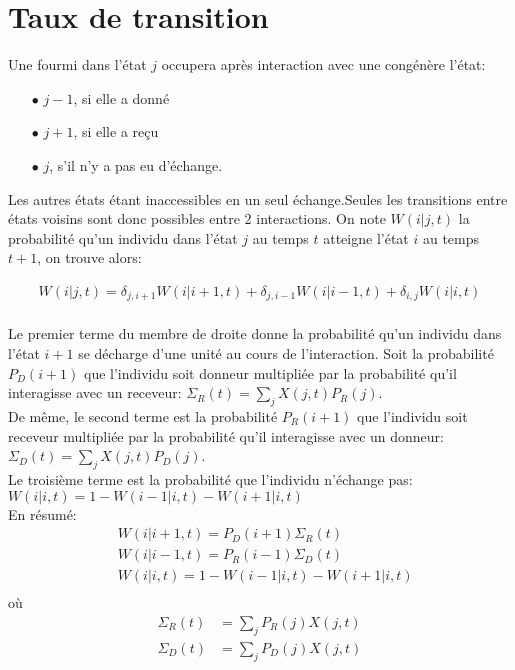 \section{Taux de transition}
Une fourmi dans l'état $j$ occupera après interaction avec une congénère l'état:
\begin{itemize}
\item[$\bullet$] $j-1$, si elle a donné
\item[$\bullet$] $j+1$, si elle a reçu
\item[$\bullet$] $j$, s'il n'y a pas eu d'échange.
\end{itemize}
Les autres états étant inaccessibles en un seul échange.Seules les transitions entre états voisins sont donc possibles entre 2 interactions. On note $W(i|j,t)$ la probabilité qu'un individu dans l'état $j$ au temps $t$ atteigne l'état $i$ au temps $t+1$, on trouve alors:


\begin{equation}
\begin{aligned}
W(i|j,t) = \delta_{j,i+1} W(i|i+1,t) + \delta_{j,i-1} W(i|i-1,t) + \delta_{i,j} W(i|i,t)\\
\label{Wij}
\end{aligned}
\end{equation}


Le premier terme du membre de droite donne la probabilité qu'un individu dans l'état $i+1$ se décharge d'une unité au cours de l'interaction. Soit la probabilité $P_D(i+1)$ que l'individu soit donneur multipliée par la probabilité qu'il interagisse avec un receveur: $\Sigma_R(t) = \sum_j X(j,t) P_R(j)$.\\
De même, le second terme est la probabilité $P_R(i+1)$ que l'individu soit receveur multipliée par la probabilité qu'il interagisse avec un donneur: $\Sigma_D(t) = \sum_j X(j,t) P_D(j)$.\\
Le troisième terme est la probabilité que l'individu n'échange pas: $W(i|i,t) = 1 - W(i-1|i,t)- W(i+1|i,t)$\\


En résumé:
\begin{equation}
\begin{aligned}
&W(i|i+1,t)= P_D(i+1) \Sigma_R(t)\\
&W(i|i-1,t)= P_R(i-1) \Sigma_D(t)\\
&W(i|i,t) = 1- W(i-1|i,t)- W(i+1|i,t)\\
\label{TransitionVoisins}
\end{aligned}
\end{equation}
où
\begin{equation}
\begin{aligned}
\Sigma_R	(t)	&= \sum_j P_R(j) X(j,t)\\
\Sigma_D(t) 	&= \sum_j P_D(j) X(j,t)\\
\label{SigmaRD}
\end{aligned}
\end{equation}




